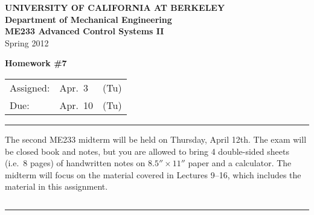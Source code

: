 \documentclass[letterpaper,12pt]{article}
\begin{document}
\begin{center}
    {\bf UNIVERSITY OF CALIFORNIA AT BERKELEY}\\
    {\bf Department of Mechanical Engineering}\\
    {\bf ME233 Advanced Control Systems II}\\
    Spring 2012\\
\end{center}
\noindent
{\Large \bf Homework \#7 }\\[-3em]
\begin{flushright}
\begin{tabular} {lll}
    Assigned: &  Apr.\ 3 & (Tu) \\
    Due: & Apr.\ 10 & (Tu)
\end{tabular}
\end{flushright}

\noindent
\rule{6.5in}{.1em}
$\:$\\

\noindent
The second ME233 midterm will be held on Thursday, April 12th. The exam will be closed book and notes, but you are allowed to bring 4 double-sided sheets (i.e.\ 8 pages) of handwritten notes on $8.5'' \times 11''$ paper and a calculator. The midterm will focus on the material covered in Lectures 9--16, which includes the material in this assignment.

$\:$\\
\rule{6.5in}{.1em}
$\:$\\


\begin{enumerate}


\newpage

%

\end{enumerate}
\end{document}

